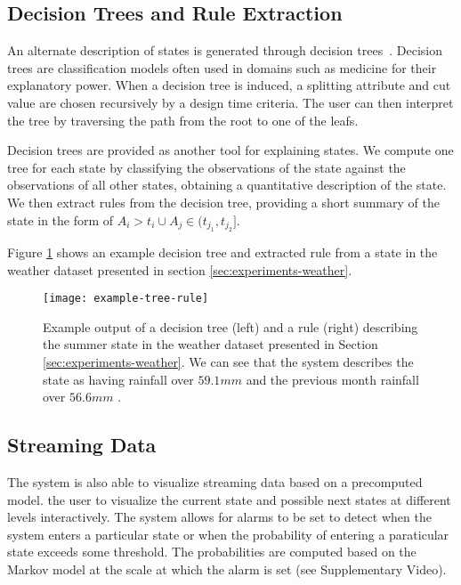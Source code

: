 \subsection{Decision Trees and Rule Extraction}

An alternate description of states is generated through decision trees~\cite{Witten:2005:DMP:1205860}. Decision
trees are classification models often used in domains such as medicine for their explanatory power.
When a decision tree is induced, a splitting attribute and cut value are chosen recursively by a
design time criteria. The user can then interpret the tree by traversing the path from the root 
to one of the leafs.

Decision trees are provided as another tool for explaining states. We compute one tree for each
state by classifying the observations of the state against the observations of all other states,
obtaining a quantitative description of the state. We then extract rules from the decision tree,
providing a short summary of the state in the form of $A_i > t_i \cup A_j \in (t_{j_1}, t_{j_2}]$.

Figure \ref{fig:example-decision-tree-and-rule} shows an example decision tree and extracted rule
from a state in the weather dataset presented in section \ref{sec:experiments-weather}.

\begin{figure}[h!]
	\centering
	\texttt{[image: example-tree-rule]}
	\caption{Example output of a decision tree (left) and a rule (right) describing the summer state in the weather dataset presented in Section \ref{sec:experiments-weather}. We can see that the system describes the state as having rainfall over $59.1 mm$ and the previous month rainfall over $56.6 mm$ .}
	\label{fig:example-decision-tree-and-rule}
\end{figure}

\subsection{Streaming Data}

The system is also able to visualize streaming data based on a precomputed model. 
the user to visualize the current state and possible next states at different levels interactively. The system allows for alarms to be set to detect when the system enters a particular state or when the probability of entering a paraticular state exceeds some threshold. The probabilities are computed based on the Markov model at the scale at which the alarm is set 
(see Supplementary Video).

